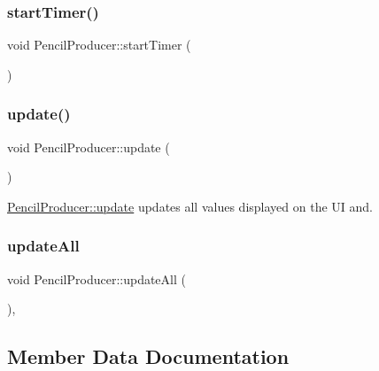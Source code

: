 \subsubsection{\texorpdfstring{start\+Timer()}{startTimer()}}
{\footnotesize\ttfamily void Pencil\+Producer\+::start\+Timer (\begin{DoxyParamCaption}{ }\end{DoxyParamCaption})\hspace{0.3cm}{\ttfamily [private]}}

\mbox{\label{classPencilProducer_afcd36c151c55ad1c9024873050eaee4d}} 
\subsubsection{\texorpdfstring{update()}{update()}}
{\footnotesize\ttfamily void Pencil\+Producer\+::update (\begin{DoxyParamCaption}{ }\end{DoxyParamCaption})\hspace{0.3cm}{\ttfamily [private]}}



\hyperlink{classPencilProducer_afcd36c151c55ad1c9024873050eaee4d}{Pencil\+Producer\+::update} updates all values displayed on the UI and. 

\mbox{\label{classPencilProducer_af182bfe6656f6e068da6feb74afa0bec}} 
\subsubsection{\texorpdfstring{update\+All}{updateAll}}
{\footnotesize\ttfamily void Pencil\+Producer\+::update\+All (\begin{DoxyParamCaption}{ }\end{DoxyParamCaption})\hspace{0.3cm}{\ttfamily [private]}, {\ttfamily [slot]}}



\subsection{Member Data Documentation}
\mbox{\label{classPencilProducer_a6af6334d9d18c19f235411a4c5fafb46}} 
